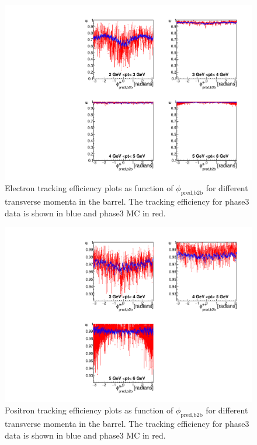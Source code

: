 \documentclass[a4paper,11pt,twosided,final,german,openbib,pdftex,listof=totoc,bibliography=totoc]{scrbook}
\begin{document}
\begin{figure}[!htbp]
	\centering
	\includegraphics[width=\textwidth]{Plots/master3/xPtMPhiemBarrelP3}
	\caption[Transverse Momentum $\phi_{\textrm{pred,b2b}}$ Electron Barrel Efficiency Phase3]{Electron tracking efficiency plots as function of $\phi_{\textrm{pred,b2b}}$ for different transverse momenta in the barrel. The tracking efficiency for phase3 data is shown in blue and phase3 MC in red.}
	\label{plt:xPtMPhiemBarrel3}
\end{figure}



\begin{figure}[!htbp]
	\centering
	\includegraphics[width=\textwidth]{Plots/master3/xPtMPhiepBarrelP3}
	\caption[Transverse Momentum $\phi_{\textrm{pred,b2b}}$ Positron Barrel Efficiency Phase3]{Positron tracking efficiency plots as function of $\phi_{\textrm{pred,b2b}}$ for different transverse momenta in the barrel. The tracking efficiency for phase3 data is shown in blue and phase3 MC in red.}
	\label{plt:xPtMPhiepBarrel3}
\end{figure}
\end{document}
